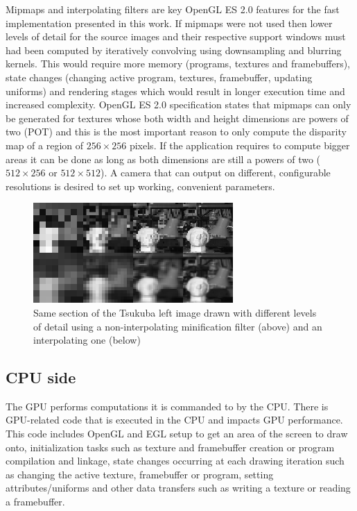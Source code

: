 \documentclass[conference]{IEEEtran}
\begin{document}
Mipmaps and interpolating filters are key OpenGL ES 2.0 features for the fast implementation presented in this work. If mipmaps were not used then lower levels of detail for the source images and their respective support windows must had been computed by iteratively convolving using downsampling and blurring kernels. This would require more memory (programs, textures and framebuffers), state changes (changing active program, textures, framebuffer, updating uniforms) and rendering stages which would result in longer execution time and increased complexity. OpenGL ES 2.0 specification states that mipmaps can only be generated for textures whose both width and height dimensions are powers of two (POT) and this is the most important reason to only compute the disparity map of a region of $256 \times 256$ pixels. If the application requires to compute bigger areas it can be done as long as both dimensions are still a powers of two ($512 \times 256$ or $512 \times 512$). A camera that can output on different, configurable resolutions is desired to set up working, convenient parameters.

\begin{figure}[!t]
 \centering
 \includegraphics[width=3.0in]{filters}
 \caption{Same section of the Tsukuba left image drawn with different levels of detail using a non-interpolating minification filter (above) and an interpolating one (below)}
 \label{fig:filters}
\end{figure}

 \subsection{CPU side}
The GPU performs computations it is commanded to by the CPU. There is GPU-related code that is executed in the CPU and impacts GPU performance. This code includes OpenGL and EGL setup to get an area of the screen to draw onto, initialization tasks such as texture and framebuffer creation or program compilation and linkage, state changes occurring at each drawing iteration such as changing the active texture, framebuffer or program, setting attributes/uniforms and other data transfers such as writing a texture or reading a framebuffer.
\end{document}
